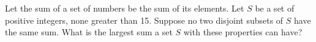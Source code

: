 Let the sum of a set of numbers be the sum of its elements. Let $S$ be a set of positive integers, none greater than 15. Suppose no two disjoint subsets of $S$ have the same sum. What is the largest sum a set $S$ with these properties can have?